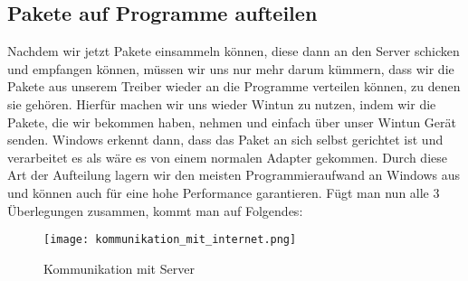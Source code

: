 \subsection{Pakete auf Programme aufteilen}
Nachdem wir jetzt Pakete einsammeln können, diese dann an den Server schicken und empfangen können, müssen wir uns nur mehr darum kümmern, dass wir die Pakete aus unserem Treiber wieder an die Programme verteilen können, zu denen sie gehören.
\newline
\newline
Hierfür machen wir uns wieder Wintun zu nutzen, indem wir die Pakete, die wir bekommen haben, nehmen und einfach über unser Wintun Gerät senden. Windows erkennt dann, dass das Paket an sich selbst gerichtet ist und verarbeitet es als wäre es von einem normalen Adapter gekommen. Durch diese Art der Aufteilung lagern wir den meisten Programmieraufwand an Windows aus und können auch für eine hohe Performance garantieren.
\newpage
Fügt man nun alle 3 Überlegungen zusammen, kommt man auf Folgendes:
\begin{figure}[H]
    \centering
    \texttt{[image: kommunikation\_mit\_internet.png]}
    \caption[Kommunikation mit Server]{Kommunikation mit Server } 
\end{figure}